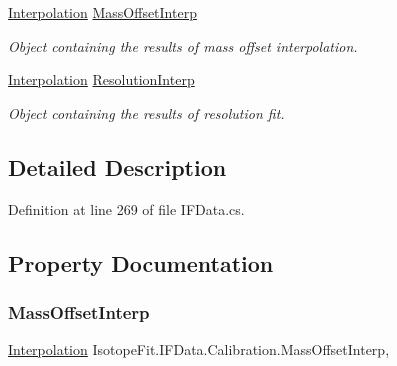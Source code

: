 \begin{DoxyCompactItemize}
\hyperlink{class_isotope_fit_1_1_interpolation}{Interpolation} \hyperlink{class_isotope_fit_1_1_i_f_data_1_1_calibration_af383c1c97a369e786e72ac5d79e8973e}{Mass\+Offset\+Interp}
\begin{DoxyCompactList}\small\item\em Object containing the results of mass offset interpolation. \end{DoxyCompactList}\item 
\hyperlink{class_isotope_fit_1_1_interpolation}{Interpolation} \hyperlink{class_isotope_fit_1_1_i_f_data_1_1_calibration_ab8db2fa10ee3de8f8deca251f4bd3518}{Resolution\+Interp}
\begin{DoxyCompactList}\small\item\em Object containing the results of resolution fit. \end{DoxyCompactList}\end{DoxyCompactItemize}


\subsection{Detailed Description}


Definition at line 269 of file I\+F\+Data.\+cs.



\subsection{Property Documentation}
\mbox{\label{class_isotope_fit_1_1_i_f_data_1_1_calibration_af383c1c97a369e786e72ac5d79e8973e}} 
\subsubsection{\texorpdfstring{Mass\+Offset\+Interp}{MassOffsetInterp}}
{\footnotesize\ttfamily \hyperlink{class_isotope_fit_1_1_interpolation}{Interpolation} Isotope\+Fit.\+I\+F\+Data.\+Calibration.\+Mass\+Offset\+Interp\hspace{0.3cm}{\ttfamily [get]}, {\ttfamily [set]}}



